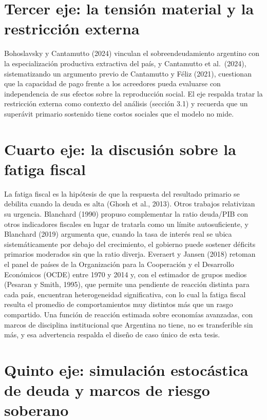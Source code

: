 \section{Tercer eje: la tensión material y la restricción externa}

Bohoslavsky y Cantamutto (2024) vinculan el sobreendeudamiento argentino
con la especialización productiva extractiva del país, y Cantamutto et
al.~(2024), sistematizando un argumento previo de Cantamutto y Féliz
(2021), cuestionan que la capacidad de pago frente a los acreedores
pueda evaluarse con independencia de sus efectos sobre la reproducción
social. El eje respalda tratar la restricción externa como contexto del
análisis (sección 3.1) y recuerda que un superávit primario sostenido
tiene costos sociales que el modelo no mide.

\section{Cuarto eje: la discusión sobre la fatiga fiscal}

La fatiga fiscal es la hipótesis de que la respuesta del resultado
primario se debilita cuando la deuda es alta (Ghosh et al., 2013). Otros
trabajos relativizan su urgencia. Blanchard (1990) propuso complementar
la ratio deuda/PIB con otros indicadores fiscales en lugar de tratarla
como un límite autosuficiente, y Blanchard (2019) argumenta que, cuando
la tasa de interés real se ubica sistemáticamente por debajo del
crecimiento, el gobierno puede sostener déficits primarios moderados sin
que la ratio diverja. Everaert y Jansen (2018) retoman el panel de
países de la Organización para la Cooperación y el Desarrollo Económicos
(OCDE) entre 1970 y 2014 y, con el estimador de grupos medios (Pesaran y
Smith, 1995), que permite una pendiente de reacción distinta para cada
país, encuentran heterogeneidad significativa, con lo cual la fatiga
fiscal resulta el promedio de comportamientos muy distintos más que un
rasgo compartido. Una función de reacción estimada sobre economías
avanzadas, con marcos de disciplina institucional que Argentina no
tiene, no es transferible sin más, y esa advertencia respalda el diseño
de caso único de esta tesis.

\section{Quinto eje: simulación estocástica de deuda y marcos de riesgo
soberano}


